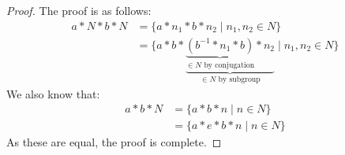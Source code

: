 \documentclass[letterpaper]{article}
\begin{document}
\begin{mdframed}
    \begin{proof}
        The proof is as follows: 
        \begin{equation*}
            \begin{aligned}
                a * N * b * N &= \{a * n_1 * b * n_2 \mid n_1, n_2 \in N\} \\
                    &= \{a * b * \underbrace{\underbrace{(b^{-1} * n_1 * b)}_{\in N \text{ by conjugation}} * n_2}_{\in N \text{ by subgroup}} \mid n_1, n_2 \in N\}
            \end{aligned}
        \end{equation*}
        We also know that: 
        \begin{equation*}
            \begin{aligned}
                a * b * N &= \{a * b * n \mid n \in N\} \\ 
                    &= \{a * e * b * n \mid n \in N\}
            \end{aligned}
        \end{equation*}
        As these are equal, the proof is complete. 
    \end{proof}    
\end{mdframed}
\end{document}
